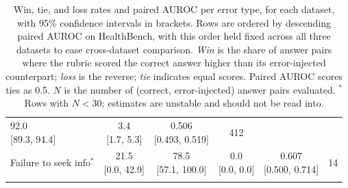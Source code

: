 {\begin{longtable}{l c c c c c}
        \makecell{92.0 \\ \footnotesize{[89.3, 94.4]}} &
        \makecell{3.4 \\ \footnotesize{[1.7, 5.3]}} &
        \makecell{0.506 \\ \footnotesize{[0.493, 0.519]}} &
        412 \\
    Failure to seek info$^{*}$ &
        \makecell{21.5 \\ \footnotesize{[0.0, 42.9]}} &
        \makecell{78.5 \\ \footnotesize{[57.1, 100.0]}} &
        \makecell{0.0 \\ \footnotesize{[0.0, 0.0]}} &
        \makecell{0.607 \\ \footnotesize{[0.500, 0.714]}} &
        14 \\
    \caption{Win, tie, and loss rates and paired AUROC per error type, for each dataset, with 95\% confidence intervals in brackets. Rows are ordered by descending paired AUROC on HealthBench, with this order held fixed across all three datasets to ease cross-dataset comparison. \textit{Win} is the share of answer pairs where the rubric scored the correct answer higher than its error-injected counterpart; \textit{loss} is the reverse; \textit{tie} indicates equal scores. Paired AUROC scores ties as 0.5. $N$ is the number of (correct, error-injected) answer pairs evaluated. $^{*}$Rows with $N < 30$; estimates are unstable and should not be read into.}
    \label{tab:win-tie-loss-auroc-per-error-all}\\
\end{longtable}
}